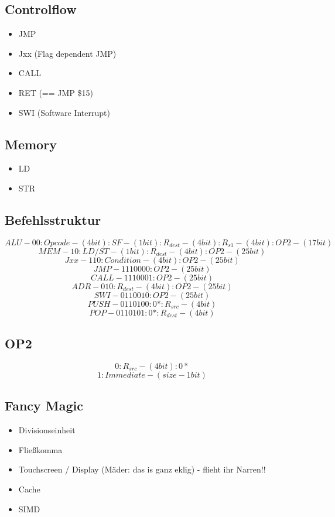 \documentclass[a4paper]{article}
\begin{document}
\begin{multicols}{2}
\subsection{Controlflow}

\begin{itemize}
\item JMP
\item Jxx (Flag dependent JMP)
\item CALL
\item RET (== JMP \$15)
\item SWI (Software Interrupt)
\end{itemize}

\subsection{Memory}

\begin{itemize}
\item LD
\item STR
\end{itemize}
\end{multicols}


\subsection{Befehlsstruktur}
\[ALU - 00 : Opcode - (4bit) : SF - (1bit) : R_{dest} - (4bit) : R_{s1} - (4bit) : OP2 - (17bit)\]
\[MEM - 10 : LD/ST - (1bit) : R_{dest} - (4bit) : OP2 - (25bit)\]
\[Jxx - 110 : Condition - (4bit) : OP2 - (25bit)\]
\[JMP - 1110000 : OP2 - (25bit)\]
\[CALL- 1110001 : OP2 - (25bit)\]
\[ADR - 010 : R_{dest} - (4bit) : OP2 - (25bit)\]
\[SWI - 0110010 : OP2 - (25bit)\]
\[PUSH- 0110100 : 0* : R_{src} - (4bit)\]
\[POP - 0110101 : 0* : R_{dest} - (4bit)\]

\subsection{OP2}
\[ 0 : R_{src} - (4bit) : 0* \]
\[ 1 : Immediate - (size-1 bit) \]

\subsection{Fancy Magic}

\begin{itemize}
\item Divisionseinheit
\item Fließkomma
\item Touchscreen / Display (Mäder: das is ganz eklig) - flieht ihr Narren!!
\item Cache
\item SIMD
\end{itemize}
\end{document}
